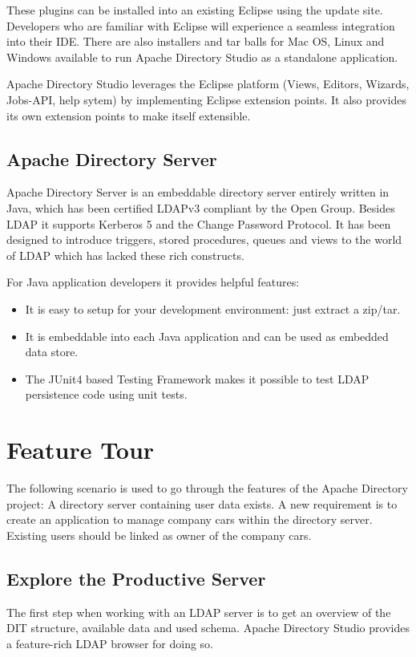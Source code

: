 \documentclass[a4paper,11pt,oneside]{article}
\begin{document}
These plugins can be installed into an existing Eclipse using the update site. Developers who are familiar with Eclipse will experience a seamless integration into their IDE. There are also installers and tar balls for Mac OS, Linux and Windows available to run Apache Directory Studio as a standalone application.

Apache Directory Studio leverages the Eclipse platform (Views, Editors, Wizards, Jobs-API, help sytem) by implementing Eclipse extension points. It also provides its own extension points to make itself extensible.

\subsection{Apache Directory Server}
Apache Directory Server is an embeddable directory server entirely written in Java, which has been certified LDAPv3 compliant by the Open Group. Besides LDAP it supports Kerberos 5 and the Change Password Protocol. It has been designed to introduce triggers, stored procedures, queues and views to the world of LDAP which has lacked these rich constructs.

For Java application developers it provides helpful features:
\begin{itemize}
\item It is easy to setup for your development environment: just extract a zip/tar.
\item It is embeddable into each Java application and can be used as embedded data store.
\item The JUnit4 based Testing Framework makes it possible to test LDAP persistence code using unit tests.
\end{itemize}

\section{Feature Tour}
The following scenario is used to go through the features of the Apache Directory project: A directory server containing user data exists. A new requirement is to create an application to manage company cars within the directory server. Existing users should be linked as owner of the company cars.

\subsection{Explore the Productive Server}
The first step when working with an LDAP server is to get an overview of the DIT structure, available data and used schema. Apache Directory Studio provides a feature-rich LDAP browser for doing so.
\end{document}
